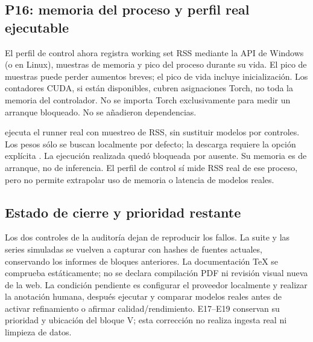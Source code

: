 \subsection{P16: memoria del proceso y perfil real ejecutable}
El perfil de control ahora registra working set RSS mediante la API de Windows
(o  en Linux), muestras de memoria y pico del proceso
durante su vida. El pico de muestras puede perder aumentos breves; el pico de
vida incluye inicialización. Los contadores CUDA, si están disponibles, cubren
asignaciones Torch, no toda la memoria del controlador. No se importa Torch
exclusivamente para medir un arranque bloqueado. No se añadieron dependencias.

 ejecuta el runner real con muestreo de RSS, sin
sustituir modelos por controles. Los pesos sólo se buscan localmente por defecto;
la descarga requiere la opción explícita .
La ejecución realizada quedó bloqueada por  ausente. Su memoria
es de arranque, no de inferencia. El perfil de control sí mide RSS real de ese
proceso, pero no permite extrapolar uso de memoria o latencia de modelos reales.

\subsection{Estado de cierre y prioridad restante}
Los dos controles de la auditoría dejan de reproducir los fallos. La suite y las
series simuladas se vuelven a capturar con hashes de fuentes actuales, conservando
los informes de bloques anteriores. La documentación TeX se comprueba
estáticamente; no se declara compilación PDF ni revisión visual nueva de la web.
La condición pendiente es configurar el proveedor localmente y realizar la
anotación humana, después ejecutar y comparar modelos reales antes de activar
refinamiento o afirmar calidad/rendimiento. E17--E19 conservan su prioridad y
ubicación del bloque V; esta corrección no realiza ingesta real ni limpieza de datos.
